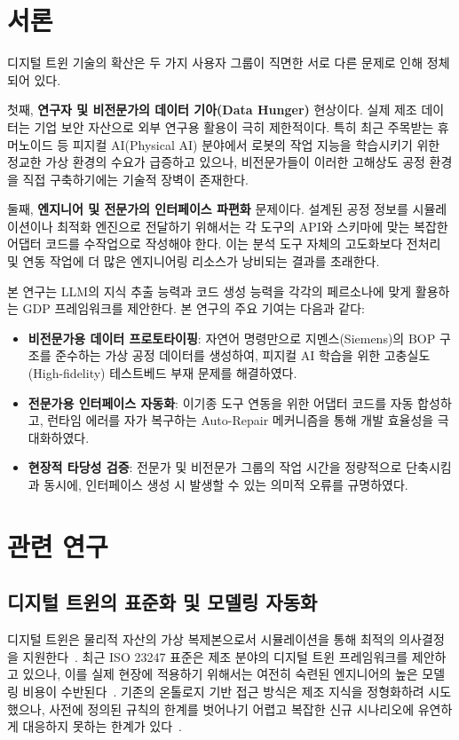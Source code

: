 \documentclass[conference]{IEEEtran}
\begin{document}
\section{서론}

디지털 트윈 기술의 확산은 두 가지 사용자 그룹이 직면한 서로 다른 문제로 인해 정체되어 있다.

첫째, \textbf{연구자 및 비전문가의 데이터 기아(Data Hunger)} 현상이다. 실제 제조 데이터는 기업 보안 자산으로 외부 연구용 활용이 극히 제한적이다. 특히 최근 주목받는 휴머노이드 등 피지컬 AI(Physical AI) 분야에서 로봇의 작업 지능을 학습시키기 위한 정교한 가상 환경의 수요가 급증하고 있으나, 비전문가들이 이러한 고해상도 공정 환경을 직접 구축하기에는 기술적 장벽이 존재한다.

둘째, \textbf{엔지니어 및 전문가의 인터페이스 파편화} 문제이다. 설계된 공정 정보를 시뮬레이션이나 최적화 엔진으로 전달하기 위해서는 각 도구의 API와 스키마에 맞는 복잡한 어댑터 코드를 수작업으로 작성해야 한다. 이는 분석 도구 자체의 고도화보다 전처리 및 연동 작업에 더 많은 엔지니어링 리소스가 낭비되는 결과를 초래한다.

본 연구는 LLM의 지식 추출 능력과 코드 생성 능력을 각각의 페르소나에 맞게 활용하는 GDP 프레임워크를 제안한다. 본 연구의 주요 기여는 다음과 같다:
\begin{itemize}
\item \textbf{비전문가용 데이터 프로토타이핑}: 자연어 명령만으로 지멘스(Siemens)의 BOP 구조를 준수하는 가상 공정 데이터를 생성하여, 피지컬 AI 학습을 위한 고충실도(High-fidelity) 테스트베드 부재 문제를 해결하였다.
\item \textbf{전문가용 인터페이스 자동화}: 이기종 도구 연동을 위한 어댑터 코드를 자동 합성하고, 런타임 에러를 자가 복구하는 Auto-Repair 메커니즘을 통해 개발 효율성을 극대화하였다.
\item \textbf{현장적 타당성 검증}: 전문가 및 비전문가 그룹의 작업 시간을 정량적으로 단축시킴과 동시에, 인터페이스 생성 시 발생할 수 있는 의미적 오류를 규명하였다.
\end{itemize}

\section{관련 연구}

\subsection{디지털 트윈의 표준화 및 모델링 자동화}
디지털 트윈은 물리적 자산의 가상 복제본으로서 시뮬레이션을 통해 최적의 의사결정을 지원한다~\cite{b1}. 최근 ISO 23247 표준은 제조 분야의 디지털 트윈 프레임워크를 제안하고 있으나, 이를 실제 현장에 적용하기 위해서는 여전히 숙련된 엔지니어의 높은 모델링 비용이 수반된다~\cite{b3, b4}. 기존의 온톨로지 기반 접근 방식은 제조 지식을 정형화하려 시도했으나, 사전에 정의된 규칙의 한계를 벗어나기 어렵고 복잡한 신규 시나리오에 유연하게 대응하지 못하는 한계가 있다~\cite{b5}.
\end{document}
